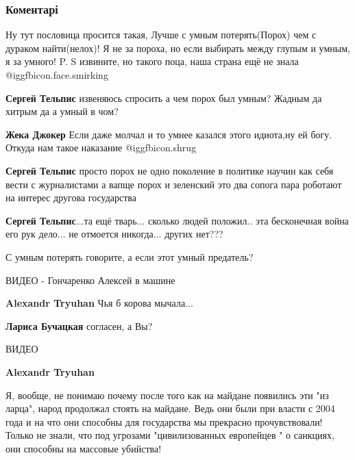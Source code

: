  
 
 
 
 
\subsubsection{Коментарі}

\begin{itemize} %

Ну тут пословица просится такая, Лучше с умным потерять(Порох) чем с дураком
найти(нелох)! Я не за пороха, но если выбирать между глупым и умным, я за умного!
P. S извините, но такого поца, наша страна ещё не знала @igg{fbicon.face.smirking} 

\begin{itemize} %
\textbf{Сергей Тельпис} извеняюсь спросить а чем порох был умным? Жадным да хитрым да а умный в чом?

\textbf{Жека Джокер} Если даже молчал и то умнее казался этого идиота,ну ей богу. Откуда нам такое наказание @igg{fbicon.shrug} 

\textbf{Сергей Тельпис} просто порох не одно поколение в политике научин как себя вести с журналистами а вапще порох и зеленский это два сопога пара роботают на интерес другова государства

\textbf{Сергей Тельпис}...та ещё тварь... сколько людей положил.. эта бесконечная война его рук дело... не отмоется никогда... других нет???

С умным потерять говорите, а если этот умный предатель?

ВИДЕО - Гончаренко Алексей в машине

\textbf{Alexandr Tryuhan}
Чья б корова мычала...

\textbf{Лариса Бучацкая} согласен, а Вы?

ВИДЕО

\textbf{Alexandr Tryuhan}

Я, вообще, не понимаю почему после того как на майдане появились эти "из
ларца", народ продолжал стоять на майдане. Ведь они были при власти с 2004 года
и на что они способны для государства мы прекрасно прочувствовали! Только не
знали, что под угрозами "цивилизованных европейцев " о санкциях, они способны
на массовые убийства!



\end{itemize}
\end{itemize}
